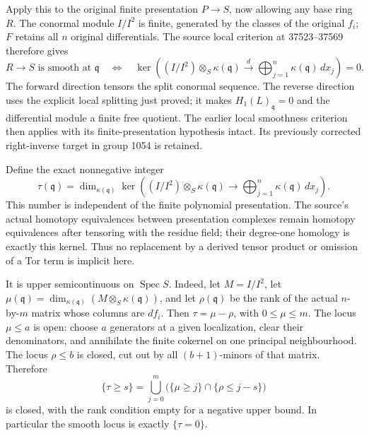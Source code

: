 Apply this to the original finite presentation \(P\to S\), now allowing any base ring \(R\). The conormal module \(I/I^2\) is finite, generated by the classes of the original \(f_i\); \(F\) retains all \(n\) original differentials. The source local criterion at 37523--37569 therefore gives \[
R\to S\text{ is smooth at }\mathfrak q
\quad\Longleftrightarrow\quad
\ker\left((I/I^2)\otimes_S\kappa(\mathfrak q)
\xrightarrow{d}\bigoplus_{j=1}^n\kappa(\mathfrak q)\,dx_j\right)=0.
\] The forward direction tensors the split conormal sequence. The reverse direction uses the explicit local splitting just proved; it makes \(H_1(L)_{\mathfrak q}=0\) and the differential module a finite free quotient. The earlier local smoothness criterion then applies with its finite-presentation hypothesis intact. Its previously corrected right-inverse target in group 1054 is retained.

Define the exact nonnegative integer \[
\tau(\mathfrak q)=
\dim_{\kappa(\mathfrak q)}
\ker\left((I/I^2)\otimes_S\kappa(\mathfrak q)
\longrightarrow\bigoplus_{j=1}^n\kappa(\mathfrak q)\,dx_j\right).
\] This number is independent of the finite polynomial presentation. The source's actual homotopy equivalences between presentation complexes remain homotopy equivalences after tensoring with the residue field; their degree-one homology is exactly this kernel. Thus no replacement by a derived tensor product or omission of a Tor term is implicit here.

It is upper semicontinuous on \(\operatorname{Spec}S\). Indeed, let \(M=I/I^2\), let \(\mu(\mathfrak q)=\dim_{\kappa(\mathfrak q)}(M\otimes_S\kappa(\mathfrak q))\), and let \(\rho(\mathfrak q)\) be the rank of the actual \(n\)-by-\(m\) matrix whose columns are \(df_i\). Then \(\tau=\mu-\rho\), with \(0\le\mu\le m\). The locus \(\mu\le a\) is open: choose \(a\) generators at a given localization, clear their denominators, and annihilate the finite cokernel on one principal neighbourhood. The locus \(\rho\le b\) is closed, cut out by all \((b+1)\)-minors of that matrix. Therefore \[
\{\tau\ge s\}=
\bigcup_{j=0}^m
\bigl(\{\mu\ge j\}\cap\{\rho\le j-s\}\bigr)
\] is closed, with the rank condition empty for a negative upper bound. In particular the smooth locus is exactly \(\{\tau=0\}\).

